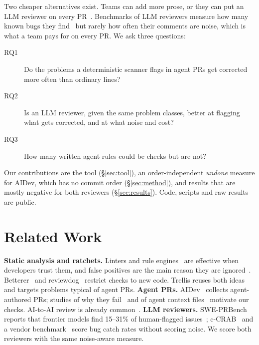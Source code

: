 \documentclass[sigconf]{acmart}
\begin{document}
Two cheaper alternatives exist. Teams can add more prose, or they can put an LLM reviewer on every PR~\cite{greptilebench}. Benchmarks of LLM reviewers measure how many known bugs they find~\cite{sweprbench,ccrab,greptilebench} but rarely how often their comments are noise, which is what a team pays for on every PR. We ask three questions:
\begin{description}
\item[RQ1] Do the problems a deterministic scanner flags in agent PRs get corrected more often than ordinary lines?
\item[RQ2] Is an LLM reviewer, given the same problem classes, better at flagging what gets corrected, and at what noise and cost?
\item[RQ3] How many written agent rules could be checks but are not?
\end{description}
Our contributions are the tool (\S\ref{sec:tool}), an order-independent \emph{undone} measure for AIDev, which has no commit order (\S\ref{sec:method}), and results that are mostly negative for both reviewers (\S\ref{sec:results}). Code, scripts and raw results are public.

\section{Related Work}
\textbf{Static analysis and ratchets.} Linters and rule engines~\cite{semgrep} are effective when developers trust them, and false positives are the main reason they are ignored~\cite{johnson2013why,sadowski2018lessons}. Betterer~\cite{betterer} and reviewdog~\cite{reviewdog} restrict checks to new code. Trellis reuses both ideas and targets problems typical of agent PRs.
\textbf{Agent PRs.} AIDev~\cite{li2026aidev} collects agent-authored PRs; studies of why they fail~\cite{ehsani2026fail} and of agent context files~\cite{chatlatanagulchai2025agentreadmes} motivate our checks. AI-to-AI review is already common~\cite{ai2ai}.
\textbf{LLM reviewers.} SWE-PRBench reports that frontier models find 15--31\% of human-flagged issues~\cite{sweprbench}; c-CRAB~\cite{ccrab} and a vendor benchmark~\cite{greptilebench} score bug catch rates without scoring noise. We score both reviewers with the same noise-aware measure.
\end{document}
